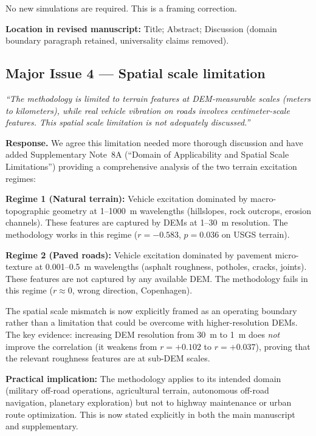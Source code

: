 \documentclass[11pt]{article}
\newcommand{\revquote}[1]{\medskip\noindent\textit{``#1''}\medskip}
\newcommand{\revloc}[1]{\noindent\textbf{Location in revised manuscript:} #1\medskip}
\begin{document}
No new simulations are required. This is a framing correction.

\revloc{Title; Abstract; Discussion (domain boundary paragraph retained, universality claims removed).}

\bigskip

\subsection*{Major Issue 4 --- Spatial scale limitation}

\revquote{The methodology is limited to terrain features at DEM-measurable scales (meters to kilometers), while real vehicle vibration on roads involves centimeter-scale features. This spatial scale limitation is not adequately discussed.}

\noindent\textbf{Response.} We agree this limitation needed more thorough discussion and have added Supplementary Note~8A (``Domain of Applicability and Spatial Scale Limitations'') providing a comprehensive analysis of the two terrain excitation regimes:

\textbf{Regime 1 (Natural terrain):} Vehicle excitation dominated by macro-topographic geometry at 1--1000~m wavelengths (hillslopes, rock outcrops, erosion channels). These features are captured by DEMs at 1--30~m resolution. The methodology works in this regime ($r = -0.583$, $p = 0.036$ on USGS terrain).

\textbf{Regime 2 (Paved roads):} Vehicle excitation dominated by pavement micro-texture at 0.001--0.5~m wavelengths (asphalt roughness, potholes, cracks, joints). These features are not captured by any available DEM. The methodology fails in this regime ($r \approx 0$, wrong direction, Copenhagen).

The spatial scale mismatch is now explicitly framed as an operating boundary rather than a limitation that could be overcome with higher-resolution DEMs. The key evidence: increasing DEM resolution from 30~m to 1~m does \emph{not} improve the correlation (it weakens from $r = +0.102$ to $r = +0.037$), proving that the relevant roughness features are at sub-DEM scales.

\textbf{Practical implication:} The methodology applies to its intended domain (military off-road operations, agricultural terrain, autonomous off-road navigation, planetary exploration) but not to highway maintenance or urban route optimization. This is now stated explicitly in both the main manuscript and supplementary.
\end{document}
